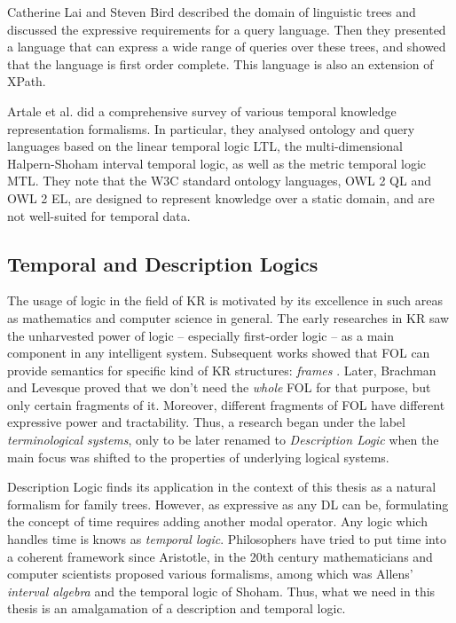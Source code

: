 Catherine Lai and Steven Bird \cite{ling} described the domain of linguistic trees and discussed the expressive requirements for a
query language. Then they presented a language that can express a wide range of queries over these trees, and showed that the
language is first order complete. This language is also an extension of XPath.

Artale et al. \cite{artale} did a comprehensive survey of various temporal knowledge representation formalisms.
In particular, they analysed ontology and query languages based on the linear
temporal logic LTL, the multi-dimensional Halpern-Shoham interval temporal logic, as well as the metric temporal logic MTL. They
note that the W3C standard ontology languages, OWL 2 QL and OWL 2 EL, are designed to represent knowledge over a static domain,
and are not well-suited for temporal data.

\subsection{Temporal and Description Logics}
The usage of logic in the field of KR is motivated by its excellence in such areas as mathematics and computer science in general.
The early researches in KR saw the unharvested power of logic -- especially first-order logic -- as a main component in any
intelligent system. Subsequent works showed that FOL can provide semantics for specific kind of KR structures:
\textit{frames} \cite{frames}. Later, Brachman and Levesque proved \cite{krhyp} that we don't need the \textit{whole} FOL for that
purpose, but only certain fragments of it. Moreover, different fragments of FOL have different expressive power and tractability.
Thus, a research began under the label \textit{terminological systems}, only to be later renamed to
\textit{Description Logic} when the main focus was shifted to the properties of underlying logical systems.

Description Logic finds its application in the context of this thesis as a natural formalism for family trees. However, as
expressive as any DL can be, formulating the concept of time requires adding another modal operator. Any logic which handles time
is knows as \textit{temporal logic}. Philosophers have tried to put time into a coherent framework since Aristotle, in
the 20th century mathematicians and computer scientists proposed various formalisms, among which was Allens' \textit{interval
algebra}\cite{allen} and the temporal logic of Shoham\cite{shoh}. Thus, what we need in this thesis is an amalgamation of a
description and temporal logic.

